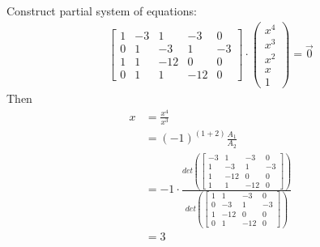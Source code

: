 \documentclass[conference,onecolumn]{IEEEtran}
\begin{document}
\begin{enumerate}[label=\arabic{enumi}.]
\begin{enumerate}
                    Construct partial system of equations:
                    \begin{align*}
                        \begin{bmatrix}
                            1 & -3 & 1   & -3  & 0  \\
                            0 & 1  & -3  & 1   & -3 \\
                            1 & 1  & -12 & 0   & 0  \\
                            0 & 1  & 1   & -12 & 0
                        \end{bmatrix} \cdot
                        \begin{pmatrix}
                            x^4 \\
                            x^3 \\
                            x^2 \\
                            x   \\
                            1
                        \end{pmatrix} = \overrightarrow{0}
                    \end{align*}
                    Then
                    \begin{align*}
                        x & = \frac{x^4}{x^3}                                                                  \\
                          & = (-1)^{(1 + 2)} \frac{A_1}{A_2}                                                   \\
                          & = -1 \cdot \frac{det(\begin{bmatrix}
                                -3 & 1   & -3  & 0  \\
                                1  & -3  & 1   & -3 \\
                                1  & -12 & 0   & 0  \\
                                1  & 1   & -12 & 0
                            \end{bmatrix})}{det(\begin{bmatrix}
                                1 & 1   & -3  & 0  \\
                                0 & -3  & 1   & -3 \\
                                1 & -12 & 0   & 0  \\
                                0 & 1   & -12 & 0
                            \end{bmatrix})} \\
                          & = 3
                    \end{align*}
          \end{enumerate}


\end{enumerate}
\end{document}
